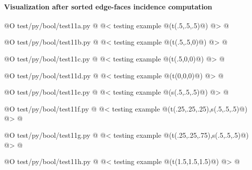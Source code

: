\documentclass[11pt,oneside]{article}    %
\begin{document}
\paragraph{Visualization after sorted edge-faces incidence computation}

@O test/py/bool/test11a.py @{
@< testing example @(t(.5,.5,.5)@) @>
@}

@O test/py/bool/test11b.py @{
@< testing example @(t(.5,.5,0)@) @>
@}

@O test/py/bool/test11c.py @{
@< testing example @(t(.5,0,0)@) @>
@}

@O test/py/bool/test11d.py @{
@< testing example @(t(0,0,0)@) @>
@}

@O test/py/bool/test11e.py @{
@< testing example @(s(.5,.5,.5)@) @>
@}

@O test/py/bool/test11f.py @{
@< testing example @(t(.25,.25,.25),s(.5,.5,.5)@) @>
@}

@O test/py/bool/test11g.py @{
@< testing example @(t(.25,.25,.75),s(.5,.5,.5)@) @>
@}

@O test/py/bool/test11h.py @{
@< testing example @(t(1.5,1.5,1.5)@) @>
@}
\end{document}

